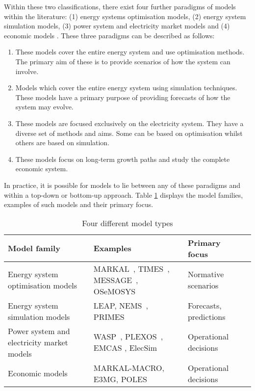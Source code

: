Within these two classifications, there exist four further paradigms of models within the literature: (1) energy systems optimisation models, (2) energy system simulation models, (3) power system and electricity market models and (4) economic models \cite{Pfenninger2014b}. These three paradigms can be described as follows:

\begin{enumerate}
	\item These models cover the entire energy system and use optimisation methods. The primary aim of these is to provide scenarios of how the system can involve.
	\item Models which cover the entire energy system using simulation techniques. These models have a primary purpose of providing forecasts of how the system may evolve.
	\item These models are focused exclusively on the electricity system. They have a diverse set of methods and aims. Some can be based on optimisation whilst others are based on simulation.
	\item These models focus on long-term growth paths and study the complete economic system.
\end{enumerate}

In practice, it is possible for models to lie between any of these paradigms and within a top-down or bottom-up approach. Table \ref{tab:litreview:modeltypes} displays the model families, examples of such models and their primary focus.


\begin{table}[]
	\footnotesize
	\caption{Four different model types \cite{Pfenninger2014b}}
	\label{tab:litreview:modeltypes}
	\begin{tabular}{p{5cm}p{7cm}ll@{}}
		\toprule
		Model family                               & Examples                                 & Primary focus                            \\ \midrule
		Energy system optimisation models          & MARKAL~\cite{Fishbone1981a}, TIMES~\cite{Giannakidis2013}, MESSAGE~\cite{Schrattenholzer1981}, OSeMOSYS~\cite{Howells2011a}        & Normative scenarios                      \\
		Energy system simulation models            & LEAP\cite{LEAP2012a}, NEMS~\cite{Grozev2005a}, PRIMES\cite{Capros2012}                       & Forecasts, predictions                   \\
		Power system and electricity market models & WASP~\cite{WASP2001}, PLEXOS~\cite{PLEXOS2013}, EMCAS \cite{Conzelmann}, ElecSim\cite{Kell}             & Operational decisions \\
		Economic models & MARKAL-MACRO, E3MG, POLES   & Operational decisions \\
		\bottomrule
	\end{tabular}
\end{table}



